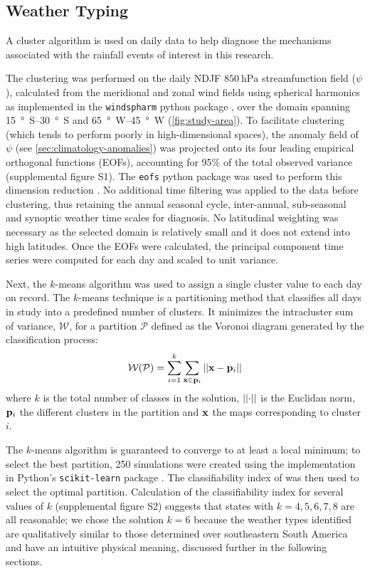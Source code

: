 \documentclass[twocol]{ametsoc}
\begin{document}
\subsection{Weather Typing}

A cluster algorithm is used on daily data to help diagnose the mechanisms associated with the rainfall events of interest in this research.

The clustering was performed on the daily NDJF $\SI{850}{\hecto\pascal}$ streamfunction field ($\psi$), calculated from the meridional and zonal wind fields using spherical harmonics as implemented in the \texttt{windspharm} python package \citep{Dawson:2016ws}, over the domain spanning \SIrange{15}{30}{\degree S} and \SIrange{65}{45}{\degree W} (\cref{fig:study-area}).
To facilitate clustering (which tends to perform poorly in high-dimensional spaces), the anomaly field of $\psi$ (see \cref{sec:climatology-anomalies}) was projected  onto its four leading empirical orthogonal functions (EOFs), accounting for 95\% of the total observed variance (supplemental figure S1).
The \texttt{eofs} python package was used to perform this dimension reduction \citep{Dawson:2016ge}.
No additional time filtering was applied to the data before clustering, thus retaining the annual seasonal cycle, inter-annual, sub-seasonal and synoptic weather time scales for diagnosis.
No latitudinal weighting was necessary as the selected domain is relatively small and it does not extend into high latitudes.
Once the EOFs were calculated, the principal component time series were computed for each day and scaled to unit variance.

Next, the $k$-means algorithm was used to assign a single cluster value to each day on record.
The $k$-means technique is a partitioning method that classifies all days in study into a predefined number of clusters.
It minimizes the intracluster sum of variance, $\mathcal{W}$, for a partition $\mathcal{P}$ defined as the Voronoi diagram generated by the classification process:
\begin{equation}
	\mathcal{W} \qty( \mathcal{P} ) = \sum_{i=1}^{k}\sum_{\vb{x} \in \vb{p}_{i}} \abs{\abs{\vb{x} - \vb{p}_i}}
\end{equation}
where $k$ is the total number of classes in the solution, $\abs{\abs{\cdot}}$ is the Euclidan norm, $\vb{p}_i$ the different clusters in the partition and $\vb{x}$ the maps corresponding to cluster $i$.

The $k$-means algorithm is guaranteed to converge to at least a local minimum; to select the best partition, 250 simulations were created using the implementation in Python's \texttt{scikit-learn} package \citep{Pedregosa:2012tv}.
The classifiability index of \citet{Michelangeli1995} was then used to select the optimal partition.
Calculation of the classifiability index for several values of $k$ (supplemental figure S2) suggests that states with $k=4,5,6,7,8$ are all reasonable; we chose the solution $k=6$ because the weather types identified are qualitatively similar to those determined over southeastern South America \citep{Munoz2015,Munoz2016} and have an intuitive physical meaning, discussed further in the following sections.
\end{document}
